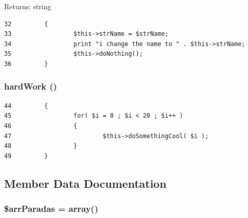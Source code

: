 \begin{Desc}
\item[Returns:]string \end{Desc}


\begin{Code}\begin{verbatim}32         {
33                 $this->strName = $strName;
34                 print "i change the name to " . $this->strName;
35                 $this->doNothing();
36         }
\end{verbatim}
\end{Code}


\hypertarget{class_example_code_reflecion_7d29a36398226ef64512719c29c01a0f}{
\subsubsection[{hardWork}]{\setlength{\rightskip}{0pt plus 5cm}hardWork ()}}
\label{class_example_code_reflecion_7d29a36398226ef64512719c29c01a0f}




\begin{Code}\begin{verbatim}44         {
45                 for( $i = 0 ; $i < 20 ; $i++ )
46                 {
47                         $this->doSomethingCool( $i );
48                 }
49         }
\end{verbatim}
\end{Code}




\subsection{Member Data Documentation}
\hypertarget{class_example_code_reflecion_b1f249f4c625c843e88d641a6a71199a}{
\subsubsection[{\$arrParadas}]{\setlength{\rightskip}{0pt plus 5cm}\$arrParadas = array()}}
\label{class_example_code_reflecion_b1f249f4c625c843e88d641a6a71199a}


